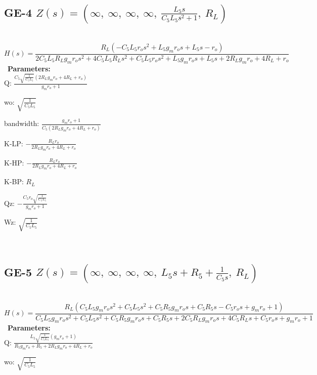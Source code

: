 \documentclass{article}
\begin{document}
\ 

\subsection{GE-4 $Z(s) = \left( \infty, \  \infty, \  \infty, \  \infty, \  \frac{L_{5} s}{C_{5} L_{5} s^{2} + 1}, \  R_{L}\right)$ } \ 
\textbf{\[H(s) = \frac{R_{L} \left(- C_{5} L_{5} r_{o} s^{2} + L_{5} g_{m} r_{o} s + L_{5} s - r_{o}\right)}{2 C_{5} L_{5} R_{L} g_{m} r_{o} s^{2} + 4 C_{5} L_{5} R_{L} s^{2} + C_{5} L_{5} r_{o} s^{2} + L_{5} g_{m} r_{o} s + L_{5} s + 2 R_{L} g_{m} r_{o} + 4 R_{L} + r_{o}}\] } \ 
\textbf{Parameters:}\\ 

Q: $\frac{C_{5} \sqrt{\frac{1}{C_{5} L_{5}}} \left(2 R_{L} g_{m} r_{o} + 4 R_{L} + r_{o}\right)}{g_{m} r_{o} + 1}$\ 

wo: $\sqrt{\frac{1}{C_{5} L_{5}}}$\ 

bandwidth: $\frac{g_{m} r_{o} + 1}{C_{5} \left(2 R_{L} g_{m} r_{o} + 4 R_{L} + r_{o}\right)}$\ 

K-LP: $- \frac{R_{L} r_{o}}{2 R_{L} g_{m} r_{o} + 4 R_{L} + r_{o}}$\ 

K-HP: $- \frac{R_{L} r_{o}}{2 R_{L} g_{m} r_{o} + 4 R_{L} + r_{o}}$\ 

K-BP: $R_{L}$\ 

Qz: $- \frac{C_{5} r_{o} \sqrt{\frac{1}{C_{5} L_{5}}}}{g_{m} r_{o} + 1}$\ 

Wz: $\sqrt{\frac{1}{C_{5} L_{5}}}$\ 

\ 

\subsection{GE-5 $Z(s) = \left( \infty, \  \infty, \  \infty, \  \infty, \  L_{5} s + R_{5} + \frac{1}{C_{5} s}, \  R_{L}\right)$ } \ 
\textbf{\[H(s) = \frac{R_{L} \left(C_{5} L_{5} g_{m} r_{o} s^{2} + C_{5} L_{5} s^{2} + C_{5} R_{5} g_{m} r_{o} s + C_{5} R_{5} s - C_{5} r_{o} s + g_{m} r_{o} + 1\right)}{C_{5} L_{5} g_{m} r_{o} s^{2} + C_{5} L_{5} s^{2} + C_{5} R_{5} g_{m} r_{o} s + C_{5} R_{5} s + 2 C_{5} R_{L} g_{m} r_{o} s + 4 C_{5} R_{L} s + C_{5} r_{o} s + g_{m} r_{o} + 1}\] } \ 
\textbf{Parameters:}\\ 

Q: $\frac{L_{5} \sqrt{\frac{1}{C_{5} L_{5}}} \left(g_{m} r_{o} + 1\right)}{R_{5} g_{m} r_{o} + R_{5} + 2 R_{L} g_{m} r_{o} + 4 R_{L} + r_{o}}$\ 

wo: $\sqrt{\frac{1}{C_{5} L_{5}}}$\ 
\end{document}
